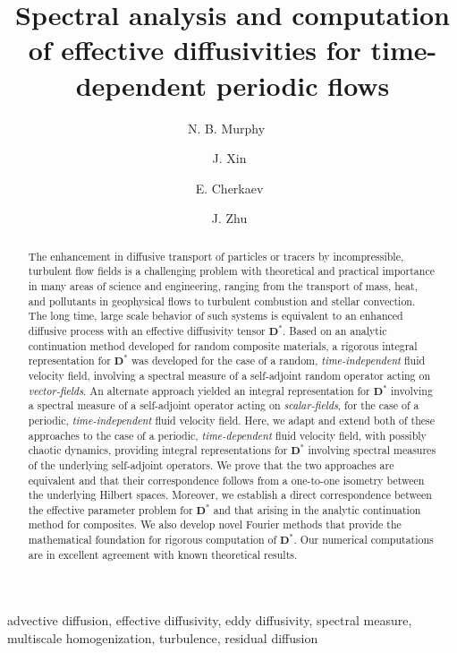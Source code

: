 \documentclass[leqno,onefignum,onetabnum]{siamltex1213}
\title{Spectral analysis and computation of effective diffusivities
  for time-dependent periodic flows  
      }
\author{
N. B. Murphy\footnotemark[1]\ \footnotemark[3]\ \footnotemark[4]
\and J. Xin\footnotemark[1]\ \footnotemark[3]
\and E. Cherkaev\footnotemark[2]\ \footnotemark[4]
\and J. Zhu\footnotemark[2]\ \footnotemark[4]%
}
\newcommand{\Db}{\mathbf{D}}
\begin{document}
\maketitle
{}%

\begin{abstract}
The enhancement in diffusive transport of particles or tracers by
incompressible, turbulent flow fields is a challenging problem with
theoretical and practical importance in many areas of science and
engineering, ranging from the transport of mass, heat, and pollutants
in geophysical flows to turbulent combustion and stellar
convection. The long time, large scale behavior of such systems is
equivalent to an enhanced diffusive process with an effective
diffusivity tensor $\Db^*$. Based on an analytic continuation method
developed for random composite materials, a rigorous integral
representation for $\Db^*$ was developed for the case of a random,
\emph{time-independent} fluid velocity field, involving a spectral
measure of a self-adjoint random operator acting on
\emph{vector-fields}. An alternate approach yielded an integral
representation for $\Db^*$ involving a spectral measure of a
self-adjoint operator acting on \emph{scalar-fields}, for the case of
a periodic, \emph{time-independent} fluid velocity field. Here, we
adapt and extend both of these approaches to the case of a periodic,
\emph{time-dependent} fluid velocity field, with possibly chaotic
dynamics, providing integral representations for $\Db^*$ involving
spectral measures of the underlying self-adjoint operators. We prove
that the two approaches are equivalent and that their correspondence
follows from a one-to-one isometry between the underlying Hilbert
spaces. Moreover, we establish a direct correspondence between the
effective parameter problem for $\Db^*$ and that arising in the
analytic continuation method for composites. We also develop novel
Fourier methods that provide the mathematical foundation for rigorous
computation of $\Db^*$. Our numerical computations are in excellent
agreement with known theoretical results.           
\end{abstract}

\begin{keywords}
advective diffusion, effective diffusivity, eddy diffusivity, spectral
measure, multiscale homogenization, turbulence, residual diffusion
\end{keywords}
\end{document}
